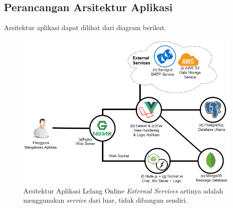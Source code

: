 
\subsection{Perancangan Arsitektur Aplikasi}

	Arsitektur aplikasi dapat dilihat dari diagram berikut.
      \begin{figure}[H]
        \centering
        \includegraphics[width=\textwidth]{images/bab3/arsitektur-app.png}
        \caption{Arsitektur Aplikasi Lelang Online 
        		\newline
                \textit{External Services} artinya adalah menggunakan \textit{service} dari luar, tidak dibangun sendiri.}
        \label{arsitektur-app}
      \end{figure}
      
    \pagebreak
